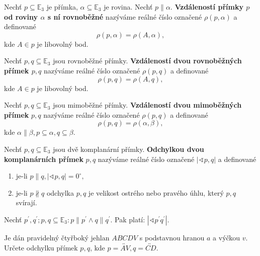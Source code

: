\begin{definition}
    Nechť $p\subseteq \mathbb E_3$ je přímka, $\alpha \subseteq \mathbb E_3$ je rovina.
    Nechť $p\parallel \alpha.$ \textbf{Vzdáleností přímky $p$ od roviny $\alpha$
    s ní rovnoběžné} nazýváme reálné číslo označené $\rho(p,\alpha)$ a definované
    $$\rho(p,\alpha)=\rho(A,\alpha),$$
    kde $A\in p$ je libovolný bod.
\end{definition}

\begin{definition}
    Nechť $p,q\subseteq \mathbb E_3$ jsou rovnoběžné přímky. \textbf{Vzdáleností
    dvou rovnoběžných přímek $p,q$} nazýváme reálné číslo označené $\rho(p,q)$ a
    definované
    $$\rho(p,q) = \rho(A,q),$$
    kde $A\in p$ je libovolný bod.
\end{definition}

\begin{definition}
    Nechť $p,q\subseteq \mathbb E_3$ jsou mimoběžné přímky. \textbf{Vzdáleností dvou
    mimoběžných přímek} $p,q$ nazýváme reálné číslo označené $\rho(p,q)$ a definované
    $$\rho(p,q)=\rho(\alpha, \beta),$$
    kde $\alpha \parallel \beta, p\subseteq\alpha, q\subseteq \beta.$
\end{definition}

\begin{definition}
    Nechť $p,q\subseteq \mathbb E_3$ jsou dvě komplanární přímky. \textbf{Odchylkou
    dvou komplanárních přímek} $p,q$ nazýváme reálné číslo označené $|\sphericalangle
    p,q|$ a definované
    \begin{enumerate}[$i.$]
    \item je-li $p\parallel q, |\sphericalangle p,q|=0^\circ,$
   	\item je-li $p\nparallel q$ odchylka $p,q$ je velikost ostrého nebo pravého úhlu,
        který $p,q$ svírají.
    \end{enumerate}
\end{definition}

\begin{veta}
    Nechť $p^\prime, q^\prime; p,q\subseteq \mathbb E_3: p\parallel p^\prime\land
    q\parallel q^\prime.$ Pak platí: $|\sphericalangle p^\prime q^\prime|.$
\end{veta}

\begin{priklad}
Je dán pravidelný čtyřboký jehlan $ABCDV$ s podstavnou hranou $a$ a výčkou $v$.
Určete odchylku přímek $p,q$, kde $p=\overleftrightarrow{AV}, q=\overleftrightarrow{CD}.$
\end{priklad}


